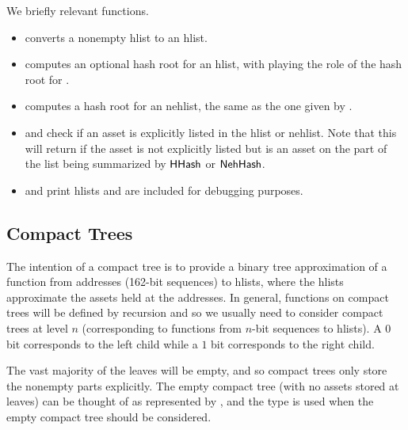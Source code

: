 We briefly relevant functions.
\begin{itemize}
\item {} converts a nonempty hlist to an hlist.
\item {} computes an optional hash root for an hlist, with {} playing
the role of the hash root for {}.
\item {} computes a hash root for an nehlist,
the same as the one given by {}.
\item {} and {} check if an asset is explicitly listed in
the hlist or nehlist. Note that this will return {} if the asset is not explicitly listed
but is an asset on the part of the list being summarized by ${\constr{HHash}}$ or ${\constr{NehHash}}$.
\item {} and {} print hlists and are included for debugging purposes.
\end{itemize}

\subsection{Compact Trees}

The intention of a compact tree is to provide a binary tree approximation of
a function from addresses (162-bit sequences) to hlists, where the hlists
approximate the assets held at the addresses.
In general, functions on compact trees will be defined by recursion and so we
usually need to consider compact trees at level $n$ (corresponding to functions
from $n$-bit sequences to hlists).
A $0$ bit corresponds to the left child while a $1$ bit corresponds to the right child.

The vast majority of the leaves will be empty, and so compact trees
only store the nonempty parts explicitly.
The empty compact tree (with no assets stored at leaves) can be thought of as
represented by {}, and the type {}
is used when the empty compact tree should be considered.

